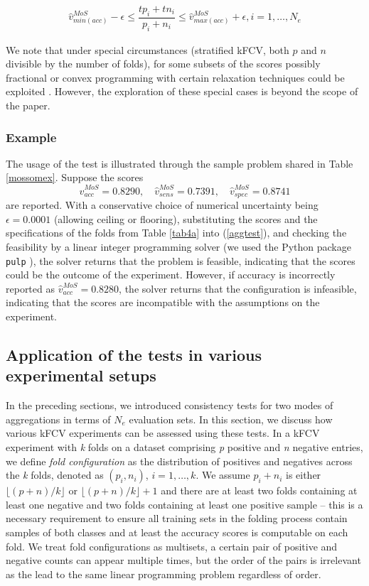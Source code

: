\documentclass[5p, final]{elsarticle}
\begin{document}
\begin{align}
\hat{v}_{min(acc)}^{MoS} - \epsilon \leq \dfrac{tp_i + tn_i}{p_i + n_i} \leq \hat{v}_{max(acc)}^{MoS} + \epsilon, i = 1, \dots, N_e
\end{align}


We note that under special circumstances (stratified kFCV, both $p$ and $n$ divisible by the number of folds), for some subsets of the scores possibly fractional or convex programming with certain relaxation techniques could be exploited \cite{nonlinear}. However, the exploration of these special cases is beyond the scope of the paper.

\subsubsection{Example}
\label{sec:mosex}

The usage of the test is illustrated through the sample problem shared in Table \ref{mossomex}. Suppose the scores
\begin{equation}
\hat{v}_{acc}^{MoS} = 0.8290, \quad
\hat{v}_{sens}^{MoS} = 0.7391, \quad
\hat{v}_{spec}^{MoS} = 0.8741
\end{equation}
are reported. With a conservative choice of numerical uncertainty being $\epsilon=0.0001$ (allowing ceiling or flooring), substituting the scores and the specifications of the folds from Table \ref{tab4a} into (\ref{aggtest}), and checking the feasibility by a linear integer programming solver (we used the Python package \verb|pulp| \cite{pulp}), the solver returns that the problem is feasible, indicating that the scores could be the outcome of the experiment. However, if accuracy is incorrectly reported as $\hat{v}_{acc}^{MoS} = 0.8280$, the solver returns that the configuration is infeasible, indicating that the scores are incompatible with the assumptions on the experiment.

\subsection{Application of the tests in various experimental setups}
\label{sec:mapping}

In the preceding sections, we introduced consistency tests for two modes of aggregations in terms of $N_e$ evaluation sets. In this section, we discuss how various kFCV experiments can be assessed using these tests. In a kFCV experiment with \emph{k} folds on a dataset comprising \emph{p} positive and \emph{n} negative entries, we define \emph{fold configuration} as the distribution of positives and negatives across the \emph{k} folds, denoted as $(p_i, n_i)$, $i=1, \dots, k$. We assume $p_i + n_i$ is either $\lfloor (p + n) / k\rfloor$ or $\lfloor (p + n) / k\rfloor + 1$ and there are at least two folds containing at least one negative and two folds containing at least one positive sample -- this is a necessary requirement to ensure all training sets in the folding process contain samples of both classes and at least the accuracy scores is computable on each fold.
We treat fold configurations as multisets, a certain pair of positive and negative counts can appear multiple times, but the order of the pairs is irrelevant as the lead to the same linear programming problem regardless of order.
\end{document}
